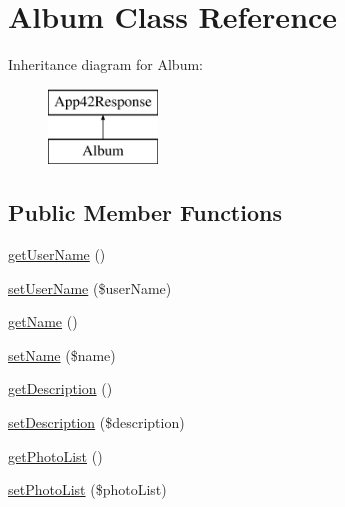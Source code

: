 \hypertarget{class_album}{\section{Album Class Reference}
\label{class_album}
}
Inheritance diagram for Album\+:\begin{figure}[H]
\begin{center}
\leavevmode
\includegraphics[height=2.000000cm]{class_album}
\end{center}
\end{figure}
\subsection*{Public Member Functions}
\begin{DoxyCompactItemize}
\item 
\hyperlink{class_album_aafd6d1ef27e6acc5833aba4012e5ee77}{get\+User\+Name} ()
\item 
\hyperlink{class_album_a20f0087f72763b84d2992ba6ffee2fb2}{set\+User\+Name} (\$user\+Name)
\item 
\hyperlink{class_album_a3d0963e68bb313b163a73f2803c64600}{get\+Name} ()
\item 
\hyperlink{class_album_a2fe666694997d047711d7653eca2f132}{set\+Name} (\$name)
\item 
\hyperlink{class_album_a2e7bb35c71bf1824456ceb944cb7a845}{get\+Description} ()
\item 
\hyperlink{class_album_a31fad3e39336ea079ea758e051866627}{set\+Description} (\$description)
\item 
\hyperlink{class_album_ab8fd50fdb52fe4b7588693f25e68b9a0}{get\+Photo\+List} ()
\item 
\hyperlink{class_album_ac1a14d3b07cc738be5aa6471be2418de}{set\+Photo\+List} (\$photo\+List)
\end{DoxyCompactItemize}
